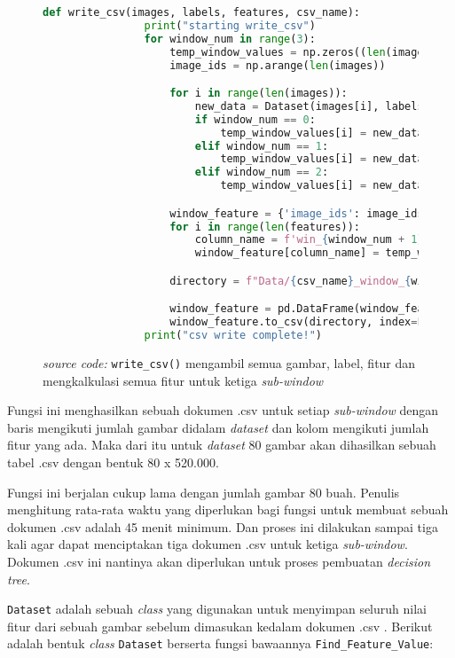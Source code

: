	\begin{figure}[H]
		\begin{lstlisting}[language=Python, basicstyle=\tiny]
			def write_csv(images, labels, features, csv_name):
				print("starting write_csv")
				for window_num in range(3):
					temp_window_values = np.zeros((len(images), len(features)), dtype=object)
					image_ids = np.arange(len(images))

					for i in range(len(images)):
						new_data = Dataset(images[i], labels[i], features)
						if window_num == 0:
							temp_window_values[i] = new_data.window_1_features
						elif window_num == 1:
							temp_window_values[i] = new_data.window_2_features
						elif window_num == 2:
							temp_window_values[i] = new_data.window_3_features

					window_feature = {'image_ids': image_ids}
					for i in range(len(features)):
						column_name = f'win_{window_num + 1}_feature_{i}'
						window_feature[column_name] = temp_window_values[:, i]

					directory = f"Data/{csv_name}_window_{window_num}.csv"

					window_feature = pd.DataFrame(window_feature)
					window_feature.to_csv(directory, index=False)
				print("csv write complete!")
		\end{lstlisting}
		\caption{\emph{source code:} \texttt{write\_csv()} mengambil semua gambar, 
		label, fitur dan mengkalkulasi semua fitur untuk ketiga \textit{sub-window}}
		\label{code:calculate all features}
	\end{figure}

	Fungsi ini menghasilkan sebuah dokumen .csv untuk setiap \textit{sub-window} dengan
	baris mengikuti jumlah gambar didalam \textit{dataset} dan kolom mengikuti jumlah fitur yang ada. 
	Maka dari itu untuk \emph{dataset} 80 gambar akan dihasilkan sebuah tabel .csv dengan 
	bentuk 80 x 520.000.

	Fungsi ini berjalan cukup lama dengan jumlah gambar 80 buah. Penulis menghitung rata-rata 
	waktu yang diperlukan bagi fungsi untuk membuat sebuah dokumen .csv adalah 45 menit minimum. 
	Dan proses ini dilakukan sampai tiga kali agar dapat menciptakan tiga dokumen .csv untuk ketiga 
	\textit{sub-window}. Dokumen .csv ini nantinya akan diperlukan untuk proses pembuatan \emph{decision tree}.

	\texttt{Dataset} adalah sebuah \textit{class} yang digunakan untuk menyimpan seluruh nilai fitur 
	dari sebuah gambar sebelum dimasukan kedalam dokumen .csv .  
	Berikut adalah bentuk \textit{class} \texttt{Dataset} berserta 
	fungsi bawaannya \texttt{Find\_Feature\_Value}:

